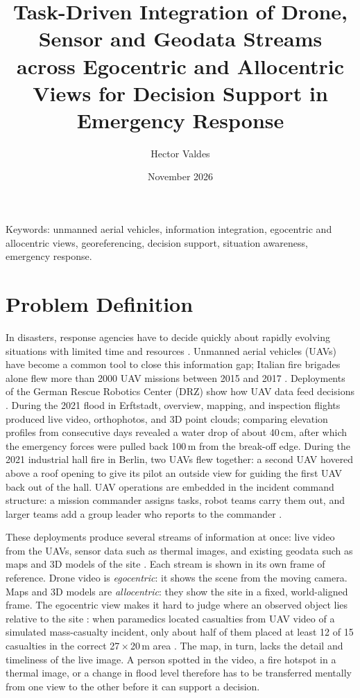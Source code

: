 \documentclass{article}
\title{Task-Driven Integration of Drone, Sensor and Geodata Streams across Egocentric and Allocentric Views for Decision Support in Emergency Response}
\author{Hector Valdes}
\date{November 2026}
\begin{document}
\maketitle

Keywords:
unmanned aerial vehicles, information integration, egocentric and allocentric views, georeferencing, decision support, situation awareness, emergency response.

\section{Problem Definition}
In disasters, response agencies have to decide quickly about rapidly evolving situations with limited time and resources \cite{kedia2020sa}.
Unmanned aerial vehicles (UAVs) have become a common tool to close this information gap; Italian fire brigades alone flew more than 2000 UAV missions between 2015 and 2017 \cite{delmerico2019}.
Deployments of the German Rescue Robotics Center (DRZ) show how UAV data feed decisions \cite{surmann2024}.
During the 2021 flood in Erftstadt, overview, mapping, and inspection flights produced live video, orthophotos, and 3D point clouds; comparing elevation profiles from consecutive days revealed a water drop of about 40\,cm, after which the emergency forces were pulled back 100\,m from the break-off edge.
During the 2021 industrial hall fire in Berlin, two UAVs flew together: a second UAV hovered above a roof opening to give its pilot an outside view for guiding the first UAV back out of the hall.
UAV operations are embedded in the incident command structure: a mission commander assigns tasks, robot teams carry them out, and larger teams add a group leader who reports to the commander \cite{surmann2024}.

These deployments produce several streams of information at once: live video from the UAVs, sensor data such as thermal images, and existing geodata such as maps and 3D models of the site \cite{surmann2024, delmerico2019}.
Each stream is shown in its own frame of reference.
Drone video is \emph{egocentric}: it shows the scene from the moving camera.
Maps and 3D models are \emph{allocentric}: they show the site in a fixed, world-aligned frame.
The egocentric view makes it hard to judge where an observed object lies relative to the site \cite{hollands2011}: when paramedics located casualties from UAV video of a simulated mass-casualty incident, only about half of them placed at least 12 of 15 casualties in the correct 27\,$\times$\,20\,m area \cite{sibley2018uav}.
The map, in turn, lacks the detail and timeliness of the live image.
A person spotted in the video, a fire hotspot in a thermal image, or a change in flood level therefore has to be transferred mentally from one view to the other before it can support a decision.
\end{document}
